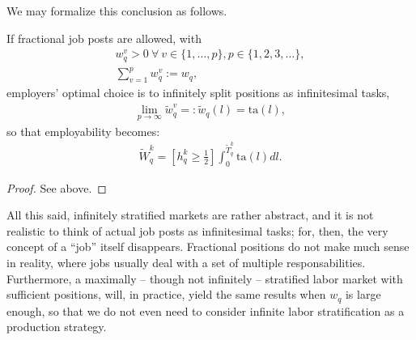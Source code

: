 \documentclass[hidelinks, nonatbib]{elsarticle}
\begin{document}
We may formalize this conclusion as follows.
\begin{lemma}
    \label{isl}
    If fractional job posts are allowed, with
    \begin{gather}
        w_{q}^{v} 
        > 0
        \
        \forall
        \
        v \in \{1, \dots, p\}
        ,
        p \in \{1, 2, 3, \dots\}
        ,
        \\
        \sum_{v=1}^{p}
        w_{q}^{v}
        :=
        w_q
        ,
        \end{gather}
        employers' optimal choice is to infinitely split positions as infinitesimal tasks,
        \begin{gather}
            \lim_{p \rightarrow \infty}{
                \tilde{w}_{q}^{v}
            }
            =:
            \tilde{w}_{q}(l)
            =
            \text{ta}(l)
            ,
            \end{gather}
            so that employability becomes:
            \begin{gather}
                \tilde{W}_{q}^{k} 
                = 
                \left[
                    h_{q}^{k}
                    \geq
                    \frac{1}{2}
                \right]
                \int_{0}^{\tilde{T}_{q}^{k}}
                \text{ta}(l)
                dl
                .
                \end{gather}
    \begin{proof}
        See above.
    \end{proof}
\end{lemma}

All this said, infinitely stratified markets are rather abstract, and it is not realistic to think of actual job posts as infinitesimal tasks; for, then, the very concept of a ``job'' itself disappears. Fractional positions do not make much sense in reality, where jobs usually deal with a set of multiple responsabilities. Furthermore, a maximally -- though not infinitely -- stratified labor market with sufficient positions, will, in practice, yield the same results when $w_q$ is large enough, so that we do not even need to consider infinite labor stratification as a production strategy.
\end{document}
